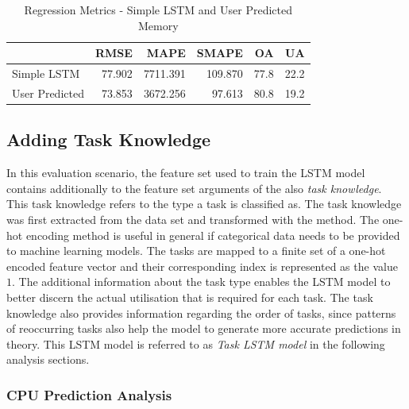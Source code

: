       \begin{table}
        \centering
        \caption{Regression Metrics - Simple LSTM and User Predicted Memory}
        \label{tab:regression-metrics-simple-lstm-user-predicted-memory}

        \begin{tabular}{|l|rrrrr|}
          \toprule
          {} &    RMSE &      MAPE &    SMAPE &    OA &    UA \\
          \midrule
          Simple LSTM &  77.902 &  7711.391 &  109.870 &  77.8 &  22.2 \\
          User Predicted  &  73.853 &  3672.256 &   97.613 &  80.8 &  19.2 \\
          \bottomrule
        \end{tabular}
      \end{table}

  \subsection{Adding Task Knowledge}
  \label{sec:adding-task-knowledge-evaluation-scenarios}

    In this evaluation scenario, the feature set used to train the LSTM model contains additionally to the feature set arguments of the  also \emph{task knowledge}. This task knowledge refers to the type a task is classified as. The task knowledge was first extracted from the data set and transformed with the  method. 
    The one-hot encoding method is useful in general if categorical data needs to be provided to machine learning models.
    The tasks are mapped to a finite set of a one-hot encoded feature vector and their corresponding index is represented as the value $1$.
    The additional information about the task type enables the LSTM model to better discern the actual utilisation that is required for each task.
    The task knowledge also provides information regarding the order of tasks, since patterns of reoccurring tasks also help the model to generate more accurate predictions in theory.
    This LSTM model is referred to as \emph{Task LSTM model} in the following analysis sections.    


    \subsubsection{CPU Prediction Analysis}
    \label{sec:cpu-prediction-analysis-task-knowledge-lstm-evaluation}

